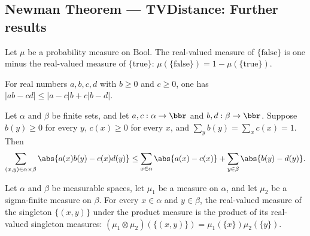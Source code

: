 \subsection*{Newman Theorem --- TVDistance: Further results}

\begin{lemma}
\label{CommunicationComplexity.TVDistance.measureReal_false_eq_one_sub_true}
\leanok
{}
Let $\mu$ be a probability measure on $\mathrm{Bool}$. The real-valued measure of
$\{\mathrm{false}\}$ is one minus the real-valued measure of $\{\mathrm{true}\}$:
$\mu(\{\mathrm{false}\})=1-\mu(\{\mathrm{true}\})$.
\end{lemma}

\begin{lemma}
\label{CommunicationComplexity.TVDistance.abs_mul_sub_mul_le}
\leanok
{}
For real numbers $a,b,c,d$ with $b\ge 0$ and $c\ge 0$, one has $\lvert ab-cd\rvert\le
\lvert a-c\rvert b+c\lvert b-d\rvert$.
\end{lemma}

\begin{lemma}
\label{CommunicationComplexity.TVDistance.sum_prod_abs_le}
\leanok
{}
Let $\alpha$ and $\beta$ be finite sets, and let $a,c:\alpha\to\bbr$ and
$b,d:\beta\to\bbr$. Suppose $b(y)\ge 0$ for every $y$, $c(x)\ge 0$ for every $x$, and
$\sum_y b(y)=\sum_x c(x)=1$. Then
\[
\sum_{(x,y)\in\alpha\times\beta}\abs{a(x)b(y)-c(x)d(y)}\leq
\sum_{x\in\alpha}\abs{a(x)-c(x)}+\sum_{y\in\beta}\abs{b(y)-d(y)}.
\]
\end{lemma}

\begin{lemma}
\label{CommunicationComplexity.TVDistance.prod_measureReal_singleton}
\leanok
{}
Let $\alpha$ and $\beta$ be measurable spaces, let $\mu_1$ be a measure on $\alpha$, and
let $\mu_2$ be a sigma-finite measure on $\beta$. For every $x\in\alpha$ and
$y\in\beta$, the real-valued measure of the singleton $\{(x,y)\}$ under the product
measure is the product of its real-valued singleton measures:
$(\mu_1\otimes\mu_2)(\{(x,y)\})=\mu_1(\{x\})\mu_2(\{y\})$.
\end{lemma}
